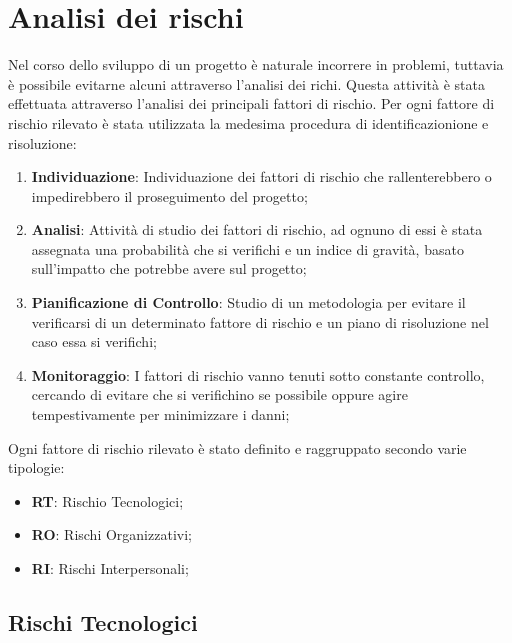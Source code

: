 \section{Analisi dei rischi}
	Nel corso dello sviluppo di un progetto è naturale incorrere in problemi, tuttavia è possibile evitarne alcuni attraverso l'analisi dei richi. Questa attività è stata effettuata attraverso l'analisi dei principali fattori di rischio. Per ogni fattore di rischio rilevato è stata utilizzata la medesima procedura di identificazionione e risoluzione:
	\begin{enumerate}
		\item \textbf{Individuazione}: Individuazione dei fattori di rischio che rallenterebbero o impedirebbero il proseguimento del progetto;
		\item \textbf{Analisi}: Attività di studio dei fattori di rischio, ad ognuno di essi è stata assegnata una probabilità che si verifichi e un indice di gravità, basato sull'impatto che potrebbe avere sul progetto;
		\item \textbf{Pianificazione di Controllo}: Studio di un metodologia per evitare il verificarsi di un determinato fattore di rischio e un piano di risoluzione nel caso essa si verifichi;
		\item \textbf{Monitoraggio}: I fattori di rischio vanno tenuti sotto constante controllo, cercando di evitare che si verifichino se possibile oppure agire tempestivamente per minimizzare i danni;
	\end{enumerate}
	Ogni fattore di rischio rilevato è stato definito e raggruppato secondo varie tipologie:
	\begin{itemize}
		\item \textbf{RT}: Rischio Tecnologici;
		\item \textbf{RO}: Rischi Organizzativi;
		\item \textbf{RI}: Rischi Interpersonali;
	\end{itemize}
	\subsection{Rischi Tecnologici}
	\def\productquality{
    		{
        		Inesperienza
			Tecnologica
			RT1,
        		La maggior parte delle tecnologie richieste nello sviluppo del progetto sono nuove per molti componenti del team, 
        		Il responsabile dovrà rilevare conoscenze e lacune dei vari componenti del team provando ad indicare una via ottimale per risolvere la mancanza di conoscenze,
        		Occorrenza: Alta 
			Pericolosità: Alta,
        		I compiti più onerasi verranno assegnati a più persone favorendo l'assistenza reciproca
    		},
	}
	
	\pagebreak
